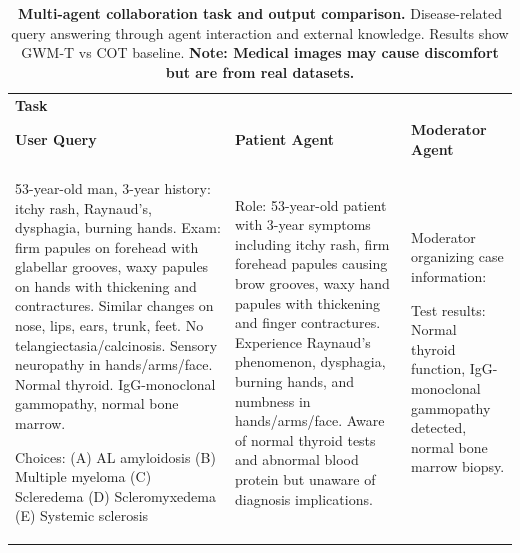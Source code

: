 \begin{table}[h]
    \centering
    \caption{\textbf{Multi-agent collaboration task and output comparison.} Disease-related query answering through agent interaction and external knowledge. Results show GWM-T vs COT baseline. \textbf{Note: Medical images may cause discomfort but are from real datasets.}}
    \label{tab:multiagent_collaboration}
    
    \renewcommand{\arraystretch}{1.0}
    \small %
    
    \begin{tabular}{|>{\centering\arraybackslash}m{4cm}|>{\centering\arraybackslash}m{5cm}|>{\centering\arraybackslash}m{5.5cm}|}
        \hline
        \multicolumn{3}{|c|}{\textbf{Task Description}} \\
        \hline
        \textbf{Task} & \multicolumn{2}{c|}{Multi-agent collaboration} \\
        \hline
        \textbf{User Query} & \textbf{Patient Agent} & \textbf{Moderator Agent} \\
        \hline
        
        53-year-old man, 3-year history: itchy rash, Raynaud's, dysphagia, burning hands. Exam: firm papules on forehead with glabellar grooves, waxy papules on hands with thickening and contractures. Similar changes on nose, lips, ears, trunk, feet. No telangiectasia/calcinosis. Sensory neuropathy in hands/arms/face. Normal thyroid. IgG-monoclonal gammopathy, normal bone marrow.
        
        Choices: (A) AL amyloidosis (B) Multiple myeloma (C) Scleredema (D) Scleromyxedema (E) Systemic sclerosis
        & 
        Role: 53-year-old patient with 3-year symptoms including itchy rash, firm forehead papules causing brow grooves, waxy hand papules with thickening and finger contractures. Experience Raynaud's phenomenon, dysphagia, burning hands, and numbness in hands/arms/face. Aware of normal thyroid tests and abnormal blood protein but unaware of diagnosis implications.
        & 
        Moderator organizing case information:
        
        Test results: Normal thyroid function, IgG-monoclonal gammopathy detected, normal bone marrow biopsy.
        

\end{tabular}
\end{table}
